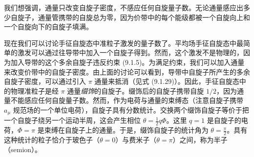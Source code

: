 我们想强调，通量只改变自旋子密度，不感应任何自旋量子数。无论通量感应出多少自旋子，通量管携带的自旋总为零，因为价带中的每个能级都被一个自旋向上和一个自旋向下的自旋子填满。

现在我们可以讨论手征自旋态中准粒子激发的量子数了。平均场手征自旋态中最简单的激发可以通过往导带中加入一个自旋子得到。然而，这个激发不是物理的，因为加入导带的这个多余自旋子违反约束 (9.1.5)。为满足约束，我们可以加入通量来改变价带中的自旋子密度。由上面的讨论可以看到，导带中自旋子所产生的多余自旋子密度，可以通过引入 $\pi$ 通量来抵消（见式 (9.1.29)）。因此，手征自旋态中的物理准粒子是经 $\pi$ 通量\emph{缀饰}的自旋子。缀饰后的自旋子携带自旋 $1/2$，因为通量不能感应任何自旋量子数。然而，作为电荷与通量的束缚态（注意自旋子携带 $a_{\mu}$ 规范场的一个单位电荷），自旋子具有分数统计。交换两个缀饰自旋子等价于把一个自旋子绕另一个运动半周，这会产生相位 $\theta=\frac{1}{2}q\Phi$。这里 $q=1$ 是自旋子的电荷，$\Phi=\pi$ 是束缚在自旋子上的通量。于是，缀饰自旋子的统计角为 $\theta=\frac{\pi}{2}$。具有这种统计的粒子恰介于玻色子（$\theta=0$）与费米子（$\theta=\pi$）之间，称为半子（semion）。

